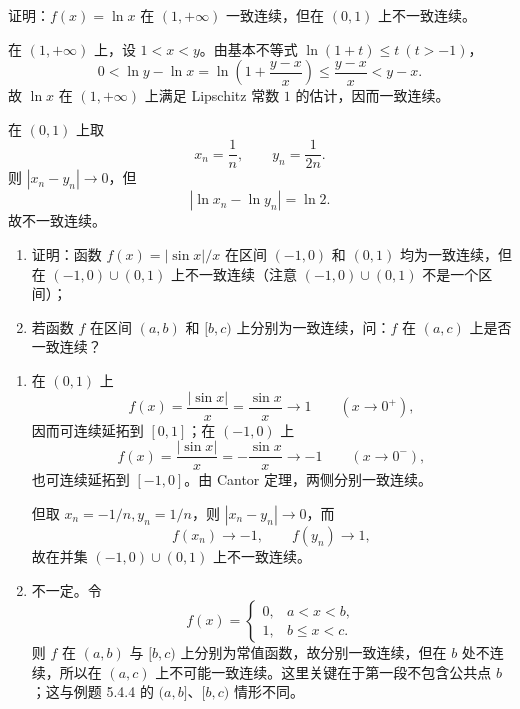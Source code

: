 \begin{xexercise}[7]
证明：$f(x)=\ln x$ 在 $(1,+\infty)$ 一致连续，但在 $(0,1)$ 上不一致连续。
\end{xexercise}
\begin{xsolution}
在 $(1,+\infty)$ 上，设 $1<x<y$。由基本不等式 $\ln(1+t)\le t\ (t>-1)$，
\[
 0<\ln y-\ln x
 =\ln\left(1+\frac{y-x}{x}\right)
 \le\frac{y-x}{x}<y-x.
\]
故 $\ln x$ 在 $(1,+\infty)$ 上满足 Lipschitz 常数 $1$ 的估计，因而一致连续。

在 $(0,1)$ 上取
\[
 x_n=\frac1n,
 \qquad y_n=\frac1{2n}.
\]
则 $|x_n-y_n|\to0$，但
\[
 |\ln x_n-\ln y_n|=\ln2.
\]
故不一致连续。
\end{xsolution}


\begin{xexercise}[8]
\begin{enumerate}[label=(\arabic*)]
    \item 证明：函数 $f(x)=|\sin x|/x$ 在区间 $(-1,0)$ 和 $(0,1)$ 均为一致连续，但在 $(-1,0)\cup(0,1)$ 上不一致连续（注意 $(-1,0)\cup(0,1)$ 不是一个区间）；
    \item 若函数 $f$ 在区间 $(a,b)$ 和 $[b,c)$ 上分别为一致连续，问：$f$ 在 $(a,c)$ 上是否一致连续？
  \end{enumerate}
\end{xexercise}
\begin{xsolution}
\begin{enumerate}[label=(\arabic*)]
 \item 在 $(0,1)$ 上
 \[
  f(x)=\frac{|\sin x|}{x}=\frac{\sin x}{x}\longrightarrow1
  \qquad(x\to0^+),
 \]
 因而可连续延拓到 $[0,1]$；在 $(-1,0)$ 上
 \[
  f(x)=\frac{|\sin x|}{x}=-\frac{\sin x}{x}\longrightarrow-1
  \qquad(x\to0^-),
 \]
 也可连续延拓到 $[-1,0]$。由 Cantor 定理，两侧分别一致连续。

 但取 $x_n=-1/n,y_n=1/n$，则 $|x_n-y_n|\to0$，而
 \[
  f(x_n)\to-1,
  \qquad f(y_n)\to1,
 \]
 故在并集 $(-1,0)\cup(0,1)$ 上不一致连续。

 \item 不一定。令
 \[
  f(x)=\begin{cases}0,&a<x<b,\\1,&b\le x<c.
  \end{cases}
 \]
 则 $f$ 在 $(a,b)$ 与 $[b,c)$ 上分别为常值函数，故分别一致连续，但在 $b$ 处不连续，所以在 $(a,c)$ 上不可能一致连续。这里关键在于第一段不包含公共点 $b$；这与例题 5.4.4 的 $(a,b]$、$[b,c)$ 情形不同。
\end{enumerate}
\end{xsolution}


